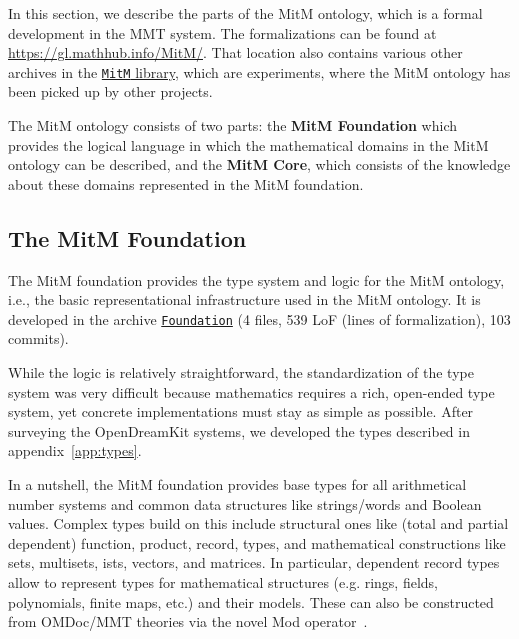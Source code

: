 \newcommand{\fold}[2]{\let\@tmpop=\relax\@for\@I:=#2\do{\@tmpop\@I\let\@tmpop=#1}}
\newcommand{\record}[1]{\{\fold{,}{#1}\}}
\newcommand{\union}[1]{[\fold{,}{#1}]}
\newcommand{\sq}{\subseteq}

In this section, we describe the parts of the MitM ontology, which is a formal development in the MMT system.
The formalizations can be found at \url{https://gl.mathhub.info/MitM/}.
That location also contains various other archives in the \href{https://gl.mathhub.info/MitM/}{\texttt{MitM} library}, which are experiments, where the MitM ontology has been picked up by other projects.

The MitM ontology consists of two parts: the \textbf{MitM Foundation} which provides the logical language in which the mathematical domains in the MitM ontology can be described, and the \textbf{MitM Core}, which consists of the knowledge about these domains represented in the MitM foundation.

\subsection{The MitM Foundation}\label{sec:foundation}

The MitM foundation provides the type system and logic for the MitM ontology, i.e., the basic representational infrastructure used in the MitM ontology.
It is developed in the archive  \href{https://gl.mathhub.info/MitM/Foundation}{\texttt{Foundation}} (4 files, 539 LoF (lines
of formalization), 103 commits).

While the logic is relatively straightforward, the standardization of the type system was very difficult because mathematics requires a rich, open-ended type system, yet concrete implementations must stay as simple as possible.
After surveying the OpenDreamKit systems, we developed the types described in appendix~\ref{app:types}.

In a nutshell, the MitM foundation provides base types for all arithmetical number systems and common data structures like strings/words and Boolean values.
Complex types build on this include structural ones like (total and partial dependent) function, product, record, types, and mathematical constructions like sets, multisets, ists, vectors, and matrices.
In particular, dependent record types allow to represent types for mathematical structures (e.g. rings, fields, polynomials, finite maps, etc.) and their models.
These can also be constructed from OMDoc/MMT theories via the novel \textsf{Mod} operator~\cite{MueRabKoh:tat18}.

